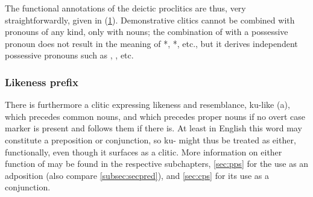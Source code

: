 The functional annotations of the deictic proclitics are thus, very
straightforwardly, given in (\ref{ex:deixproclmorphlex}). Demonstrative clitics
cannot be combined with pronouns of any kind, only with nouns; the combination
of  with a possessive pronoun does not result in the meaning of
*, *, etc., but it derives independent possessive
pronouns such as , , etc.

\begin{figure}[h]
\begin{morphlex}
\ex\label{ex:deixproclmorphlex}%
\xe
\end{morphlex}
\end{figure}

\subsubsection{Likeness prefix }
\label{subsubsec:kuprocl}

There is furthermore a clitic expressing likeness and resemblance, 
{ku-}{like (a)}, which precedes common nouns, and which precedes proper nouns
if no overt case marker is present and follows them if there is. At least in
English this word may constitute a preposition or conjunction, so 
{ku-} might thus be treated as either, functionally, even though it surfaces as
a clitic. More information on either function of  may be found
in the respective subchapters, \autoref{sec:pps} for the use as an adposition
(also compare \autoref{subsec:secpred}), and \autoref{sec:cps} for its use as a
conjunction.


